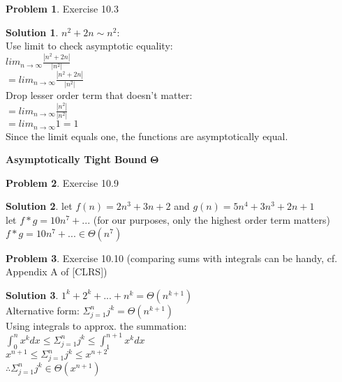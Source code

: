 \documentclass{article}
\theoremstyle{definition}
\newtheorem{problem}{Problem}
\newtheorem*{solution}{Solution}
\begin{document}
\begin{problem}
Exercise 10.3
\begin{solution}
$n^2 + 2n \sim n^2$:\\
Use limit to check asymptotic equality:\\
$lim_{n\rightarrow\infty} \frac{|n^2 + 2n|}{|n^2|}$\\
$ = lim_{n\rightarrow\infty} \frac{|n^2 + 2n|}{|n^2|}$\\
Drop lesser order term that doesn't matter:\\
$ = lim_{n\rightarrow\infty} \frac{|n^2|}{|n^2|}$\\
$ = lim_{n\rightarrow\infty} 1 = 1$\\
Since the limit equals one, the functions are asymptotically equal.
\end{solution}
\end{problem}

\noindent \textbf{Asymptotically Tight Bound} $\mathbf{\Theta}$
\begin{problem}
Exercise 10.9
\begin{solution}
let $f(n) = 2n^3 + 3n + 2$ and $g(n) = 5n^4 + 3n^3 + 2n + 1$\\
let $f * g = 10n^7 + ...$ (for our purposes, only the highest order term matters)\\
$f * g = 10n^7 + ... \in \Theta(n^7)$
\end{solution}
\end{problem}

\begin{problem}
Exercise 10.10 (comparing sums with integrals can be handy,
cf. Appendix A of [CLRS])
\begin{solution}
$1^k + 2^k + ... + n^k = \Theta(n^{k+1})$\\
Alternative form: $\Sigma^n_{j=1} j^k = \Theta(n^{k+1})$\\
Using integrals to approx. the summation:\\
$\int_0^n x^k dx \leq \Sigma^n_{j=1} j^k \leq \int_1^{n+1} x^k dx$\\
$x^{n+1} \leq \Sigma^n_{j=1} j^k \leq x^{n+2}$\\
$\therefore \Sigma^n_{j=1} j^k \in \Theta(x^{n+1})$
\end{solution}
\end{problem}
\end{document}

